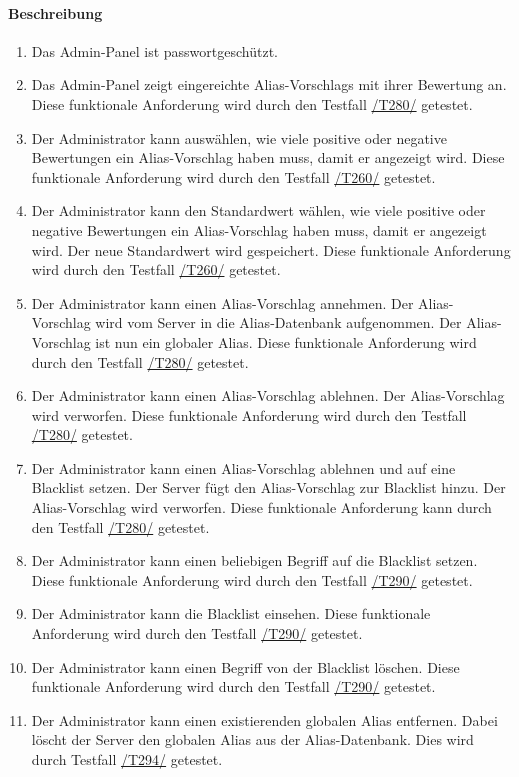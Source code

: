 \paragraph{Beschreibung}
\begin{enumerate}[start=101, label=\textbf{/FA\arabic*/}, align=left]
    \item Das \Gls{Admin-Panel} ist passwortgeschützt.
    \item \label{/FA102/} Das \Gls{Admin-Panel} zeigt eingereichte \Glspl{Alias-Vorschlag} mit ihrer Bewertung an. Diese funktionale Anforderung wird durch den Testfall \hyperref[/T280/]{/T280/} getestet.
    \item \label{/FA103/} Der \Gls{Administrator} kann auswählen, wie viele positive oder negative Bewertungen ein \Gls{Alias-Vorschlag} haben muss, damit er angezeigt wird. Diese funktionale Anforderung wird durch den Testfall \hyperref[/T260/]{/T260/} getestet.
    \item \label{/FA104/} Der \Gls{Administrator} kann den Standardwert wählen, wie viele positive oder negative Bewertungen ein \Gls{Alias-Vorschlag} haben muss, damit er angezeigt wird. Der neue Standardwert wird gespeichert. Diese funktionale Anforderung wird durch den Testfall \hyperref[/T260/]{/T260/} getestet.
    \item \label{/FA105/} Der \Gls{Administrator} kann einen \Gls{Alias-Vorschlag} annehmen. Der \Gls{Alias-Vorschlag} wird vom \Gls{Server} in die \Gls{Alias}-\Gls{Datenbank} aufgenommen. Der \Gls{Alias-Vorschlag} ist nun ein \gls{global}er \Gls{Alias}. Diese funktionale Anforderung wird durch den Testfall \hyperref[/T280/]{/T280/} getestet.
    \item \label{/FA106/} Der \Gls{Administrator} kann einen \Gls{Alias-Vorschlag} ablehnen. Der \Gls{Alias-Vorschlag} wird verworfen. Diese funktionale Anforderung wird durch den Testfall \hyperref[/T280/]{/T280/} getestet.
    \item \label{/FA107/} Der \Gls{Administrator} kann einen \Gls{Alias-Vorschlag} ablehnen und auf eine \Gls{Blacklist} setzen. Der \Gls{Server} fügt den {Alias-Vorschlag} zur \Gls{Blacklist} hinzu. Der \Gls{Alias-Vorschlag} wird verworfen. Diese funktionale Anforderung kann durch den Testfall \hyperref[/T280/]{/T280/} getestet.
    \item \label{/FA108/} Der \Gls{Administrator} kann einen beliebigen Begriff auf die \Gls{Blacklist} setzen. Diese funktionale Anforderung wird durch den Testfall \hyperref[/T290/]{/T290/} getestet.
    \item \label{/FA109/} Der \Gls{Administrator} kann die \Gls{Blacklist} einsehen. Diese funktionale Anforderung wird durch den Testfall \hyperref[/T290/]{/T290/} getestet.
    \item \label{/FA110/} Der \Gls{Administrator} kann einen Begriff von der \Gls{Blacklist} löschen. Diese funktionale Anforderung wird durch den Testfall \hyperref[/T290/]{/T290/} getestet.
    \item \label{/FA111/} Der \Gls{Administrator} kann einen existierenden \gls{global}en \Gls{Alias} entfernen. Dabei löscht der \Gls{Server} den \gls{global}en \Gls{Alias} aus der \Gls{Alias}-\Gls{Datenbank}. Dies wird durch Testfall \hyperref[/T294/]{/T294/} getestet.
\end{enumerate}